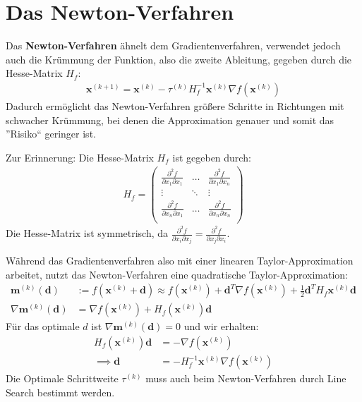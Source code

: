 \documentclass{report}
\newcommand{\tbf}{\textbf}
\newcommand{\xk}{\bm{x}^{(k)}}
\newcommand{\mk}{\bm{m}^{(k)}}
\newcommand{\tauk}{\tau^{(k)}}
\newcommand*{\newpar}{\par\vspace{\baselineskip}\noindent}
\begin{document}
\section{Das Newton-Verfahren}
Das \tbf{Newton-Verfahren} ähnelt dem Gradientenverfahren, verwendet jedoch auch die Krümmung der Funktion, also die zweite Ableitung, gegeben durch die Hesse-Matrix $H_f$:
\begin{align*}
 \bm{x}^{(k+1)} = \xk - \tauk H_f^{-1} \xk \nabla f(\xk)
\end{align*}
Dadurch ermöglicht das Newton-Verfahren größere Schritte in Richtungen mit schwacher Krümmung, bei denen die Approximation genauer und somit das ''Risiko`` geringer ist.
\newpar
Zur Erinnerung: Die Hesse-Matrix $H_f$ ist gegeben durch:
\begin{align*}
 H_f =
 \begin{pmatrix}
  \frac{\partial^2 f}{\partial x_1 \partial x_1} & \hdots & \frac{\partial^2 f}{\partial x_1 \partial x_n}\\
  \vdots & \ddots & \vdots\\
  \frac{\partial^2 f}{\partial x_n \partial x_1} & \hdots & \frac{\partial^2 f}{\partial x_n \partial x_n}\\
 \end{pmatrix}
\end{align*}
Die Hesse-Matrix ist symmetrisch, da $\frac{\partial^2 f}{\partial x_i \partial x_j} = \frac{\partial^2 f}{\partial x_j \partial x_i}$.
\newpar
Während das Gradientenverfahren also mit einer linearen Taylor-Approximation arbeitet, nutzt das Newton-Verfahren eine quadratische Taylor-Approximation:
\begin{align*}
 \mk(\bm{d}) &:= f(\xk + \bm{d}) \approx f(\xk) + {\bm{d}}^T \nabla f(\xk) + \frac{1}{2} {\bm{d}}^T H_f \xk\bm{d}\\
 \nabla \mk(\bm{d}) &= \nabla f(\xk) + H_f(\xk)\bm{d}
\end{align*}
Für das optimale $d$ ist $\nabla \mk(\bm{d}) = 0$ und wir erhalten:
\begin{align*}
 H_f(\xk)\bm{d} &= - \nabla f(\xk)\\
 \implies  \bm{d} &= - H_f^{-1} \xk \nabla f(\xk)
\end{align*}
Die Optimale Schrittweite $\tauk$ muss auch beim Newton-Verfahren durch Line Search bestimmt werden.
\end{document}

